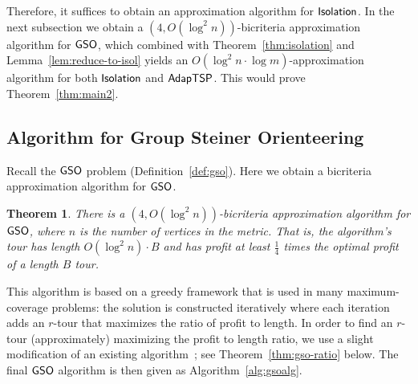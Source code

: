 \documentclass[11pt]{article}
\newtheorem{theorem}[thm]{Theorem}
\def\isoprob{\ensuremath{{\sf Isolation}}\xspace}
\def\stsp{\ensuremath{{\sf AdapTSP}}\xspace}
\def\gso{\ensuremath{{\sf GSO}}\xspace}
\begin{document}
\medskip

Therefore, it suffices to obtain an approximation algorithm for \isoprob. In the next subsection we obtain a $(4,O(\log^2n))$-bicriteria approximation  algorithm for \gso, which combined with Theorem~\ref{thm:isolation} and Lemma~\ref{lem:reduce-to-isol} yields an $O(\log^2n\cdot \log m)$-approximation algorithm for both \isoprob and \stsp.  This would prove Theorem~\ref{thm:main2}.  

\subsection{Algorithm for Group Steiner Orienteering} \label{subsec:gso}
Recall the \gso problem (Definition~\ref{def:gso}). 
Here  we obtain a bicriteria approximation algorithm for \gso.
\begin{theorem}
  \label{thm:gso}
  There is a $(4, O(\log^2n))$-bicriteria approximation algorithm for
  \gso, where $n$ is the number of vertices in the metric. That is, the algorithm's tour has length $O(\log^2n)\cdot B$ and has profit at least $\frac{1}{4}$ times the optimal profit of a length $B$ tour.
\end{theorem}


This algorithm is based on a 
greedy framework that is used in many maximum-coverage problems: the solution is constructed iteratively where each iteration adds an $r$-tour that maximizes the ratio of profit to length. In order to find an $r$-tour (approximately) maximizing the profit to length ratio, we use a slight modification of an existing algorithm~\cite{ccgg}; see Theorem~\ref{thm:gso-ratio} below.  The final \gso algorithm is then given as Algorithm~\ref{alg:gsoalg}.
\end{document}
